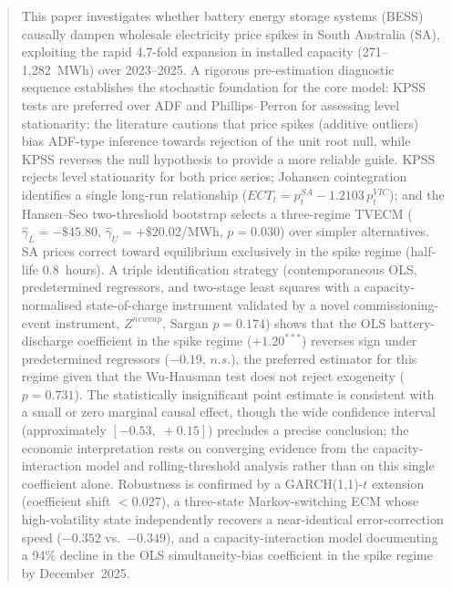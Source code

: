 \documentclass[12pt,a4paper]{article}
\newcommand{\ect}{\mathit{ECT}}
\begin{document}
\clearpage
\begin{center}
  \begin{abstract}
    \noindent
    This paper investigates whether battery energy storage systems (BESS)
    causally dampen wholesale electricity price spikes in South Australia (SA),
    exploiting the rapid 4.7-fold expansion in installed capacity
    (271--1{,}282~MWh) over 2023--2025.  A rigorous pre-estimation diagnostic
    sequence establishes the stochastic foundation for the core model: KPSS
    tests are preferred over ADF and Phillips--Perron for assessing level
    stationarity: the literature cautions that price spikes (additive outliers)
    bias ADF-type inference towards rejection of the unit root null, while KPSS
    reverses the null hypothesis to provide a more reliable guide.  KPSS
    rejects level stationarity for both price series; Johansen cointegration
    identifies a single long-run relationship
    ($\ect_t = p_t^{SA} - 1.2103\,p_t^{VIC}$); and the Hansen--Seo two-threshold
    bootstrap selects a three-regime TVECM ($\hat{\gamma}_{L} = -\$45.80$,
    $\hat{\gamma}_{U} = +\$20.02$/MWh, $p = 0.030$) over simpler alternatives.
    SA prices correct toward equilibrium exclusively in the spike regime
    (half-life 0.8~hours).  A triple identification strategy (contemporaneous
    OLS, predetermined regressors, and two-stage least squares with a
    capacity-normalised state-of-charge instrument validated by a novel
    commissioning-event instrument, $Z^{newcap}$, Sargan $p = 0.174$) shows
    that the OLS battery-discharge coefficient in the spike regime
    ($+1.20^{***}$) reverses sign under predetermined regressors ($-0.19$,
    $n.s.$), the preferred estimator for this regime given that the Wu-Hausman
    test does not reject exogeneity ($p = 0.731$).  The statistically
    insignificant point estimate is consistent with a small or zero marginal
    causal effect, though the wide confidence interval
    (approximately $[-0.53,\;+0.15]$) precludes a precise conclusion; the
    economic interpretation rests on converging evidence from the
    capacity-interaction model and rolling-threshold analysis rather than on
    this single coefficient alone.  Robustness is confirmed by a
    GARCH(1,1)-$t$ extension (coefficient shift $<$0.027), a three-state
    Markov-switching ECM whose high-volatility state independently recovers
    a near-identical error-correction speed ($-0.352$ vs.\ $-0.349$), and a
    capacity-interaction model documenting a 94\% decline in the OLS
    simultaneity-bias coefficient in the spike regime by December~2025.
  \end{abstract}
\end{center}
\clearpage
\end{document}
